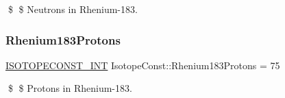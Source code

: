 \$ \$ Neutrons in Rhenium-\/183. \mbox{\label{group___isotope_const-_rhenium-_re183_gaedb30194d9cd4f4cc329b541dc6011f2}} 
\subsubsection{\texorpdfstring{Rhenium183\+Protons}{Rhenium183Protons}}
{\footnotesize\ttfamily \mbox{\hyperlink{group___isotope_const-_macros_ga5f18360b3e99483a35c32d789e62621c}{I\+S\+O\+T\+O\+P\+E\+C\+O\+N\+S\+T\+\_\+\+I\+NT}} Isotope\+Const\+::\+Rhenium183\+Protons = 75}

\$ \$ Protons in Rhenium-\/183. 
